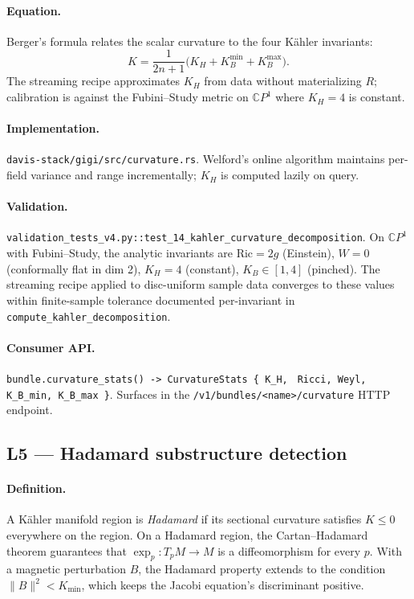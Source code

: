 \documentclass[11pt,letterpaper]{article}
\begin{document}
\paragraph{Equation.}
Berger's formula relates the scalar curvature to the four
K\"ahler invariants:
\[
K = \frac{1}{2n+1} \bigl( K_H + K_B^{\min} + K_B^{\max} \bigr).
\]
The streaming recipe approximates $K_H$ from data without
materializing $R$; calibration is against the Fubini--Study metric
on $\mathbb{C}P^1$ where $K_H = 4$ is constant.

\paragraph{Implementation.}
\texttt{davis-stack/gigi/src/curvature.rs}. Welford's online
algorithm maintains per-field variance and range incrementally;
$K_H$ is computed lazily on query.

\paragraph{Validation.}
\texttt{validation\_tests\_v4.py::test\_14\_kahler\_curvature\_decomposition}.
On $\mathbb{C}P^1$ with Fubini--Study, the analytic invariants are
$\text{Ric} = 2g$ (Einstein), $W = 0$ (conformally flat in dim 2),
$K_H = 4$ (constant), $K_B \in [1, 4]$ (pinched). The streaming
recipe applied to disc-uniform sample data converges to these
values within finite-sample tolerance documented per-invariant in
\texttt{compute\_kahler\_decomposition}.

\paragraph{Consumer API.}
\verb|bundle.curvature_stats() -> CurvatureStats { K_H, |
\verb|Ricci, Weyl, K_B_min, K_B_max }|. Surfaces in the
\verb|/v1/bundles/<name>/curvature| HTTP endpoint.


\subsection{L5 --- Hadamard substructure detection}

\paragraph{Definition.}
A K\"ahler manifold region is \emph{Hadamard} if its sectional
curvature satisfies $K \leq 0$ everywhere on the region. On a
Hadamard region, the Cartan--Hadamard theorem guarantees that
$\exp_p: T_pM \to M$ is a diffeomorphism for every $p$. With a
magnetic perturbation $B$, the Hadamard property extends to the
condition $\|B\|^2 < K_{\min}$, which keeps the Jacobi equation's
discriminant positive.
\end{document}
